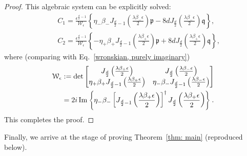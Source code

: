 \documentclass[11pt,a4paper,english,reqno]{amsart}
\theoremstyle{plain}
\newcommand{\e}{\epsilon}
\newcommand{\1}{\mathbbm{1}}
\begin{document}
\begin{proof}
This algebraic system can be explicitly solved:
\begin{eqnarray*}
&&C_1 = \frac{\e^{\frac{d}{2}-1}}{\mathcal{W}_\e} \left\{\eta_-\beta_-J_{\frac{d}{2}-1}\left( \frac{\lambda\beta_-\e}{2} \right)\mathfrak{p} - 8d J_{\frac{d}{2}}\left( \frac{\lambda\beta_-\e}{2} \right)\mathfrak{q}\right\},\\
&&C_2 = \frac{\e^{\frac{d}{2}-1}}{\mathcal{W}_\e} \left\{-\eta_+\beta_+ J_{\frac{d}{2}-1}\left( \frac{\lambda\beta_+\e}{2} \right)\mathfrak{p} + 8d J_{\frac{d}{2}}\left( \frac{\lambda\beta_+\e}{2} \right)\mathfrak{q}\right\},
\end{eqnarray*}
where (comparing with Eq.~\eqref{wronskian, purely imaginary})
\begin{align*}
\mathcal{W}_\e &:= \det \begin{bmatrix}
J_{\frac{d}{2}}\left( \frac{\lambda  \beta_+ \e}{2}\right) & J_{\frac{d}{2}}\left( \frac{\lambda  \beta_- \e}{2}\right)\\
\eta_+ \beta_+  J_{\frac{d}{2}-1} \left( \frac{\lambda \beta_+ \e}{2}\right) & \eta_- \beta_- J_{\frac{d}{2}-1} \left( \frac{\lambda \beta_- \e}{2}\right)
\end{bmatrix}\\
& = 2i\,{\rm Im}\left\{\eta_-\beta_-\left[J_{\frac{d}{2}-1}\left(\frac{\lambda\beta_+\e}{2}\right)\right]^\dagger J_{\frac{d}{2}}\left(\frac{\lambda\beta_+\e}{2}\right) \right\}.
\end{align*}
This completes the proof.  \end{proof}


Finally, we arrive at the stage of proving Theorem~\ref{thm: main} (reproduced below).
\end{document}
